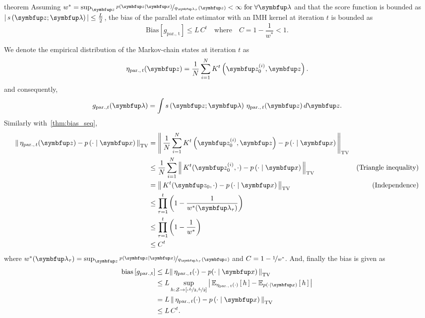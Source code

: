 
\begin{theoremEnd}{theorem}
  Assuming \(w^* = \sup_{\vz} \nicefrac{p\left(\vz\mid\vx\right)}{q_{\vlambda_{\tau}}\left(\vz\right)} < \infty \; \text{for}\;\forall \vlambda \) and that the score function is bounded as \(\left|\, s\left(\vz; \vlambda\right) \,\right| \leq \frac{L}{2}\), the bias of the parallel state estimator with an IMH kernel at iteration \(t\) is bounded as
  {\small
\[
    \mathrm{Bias}\left[ g_{\mathrm{par.,\, t}} \right] \leq L\,C^t \quad\text{where}\quad C = 1 - \frac{1}{w^*} < 1.
\]
  }
\end{theoremEnd}
\begin{proofEnd}
  We denote the empirical distribution of the Markov-chain states at iteration \(t\) as
  \begin{align}
    \eta_{\mathrm{par.},\, t}(\vz) = \frac{1}{N} \sum_{i=1}^N K^{t}\left(\vz_0^{(i)}, \vz\right).
  \end{align}
  and consequently,
  \begin{align}
      g_{\mathrm{par.}, t}(\vlambda) = \int s\left(\vz; \vlambda\right) \, \eta_{\mathrm{par.},\, t}(\vz) \, d\vz.
  \end{align}
  Similarly with~\cref{thm:bias_seq}, 
  \begin{align}
    \DTV{ \eta_{\mathrm{par.},\, t}(\vz) }{p\left(\cdot\mid\vx\right)}
    &= \DTV{\frac{1}{N} \sum_{i=1}^N K^{t}\left(\vz_0^{(i)}, \vz\right)}{p\left(\cdot\mid\vx\right)} \\
    &\leq \frac{1}{N} \sum_{i=1}^N  \DTV{K^t(\vz_0^{(i)}, \cdot)}{p\left(\cdot\mid\vx\right)} &\text{(Triangle inequality)} \\
    &=    \DTV{K^t(\vz_0, \cdot)}{p\left(\cdot\mid\vx\right)} &\text{(Independence)} \\
    &\leq \prod_{\tau=1}^t {\left(1 - \frac{1}{w^*(\vlambda_{\tau})}\right)} \\
    &\leq \prod_{\tau=1}^t {\left(1 - \frac{1}{w^*}\right)} \\
    &\leq C^t
  \end{align}
  where \(w^*(\vlambda_{\tau}) = \sup_{\vz} \nicefrac{p\left(\vz\mid\vx\right)}{q_{\vlambda_{\tau}}\left(\vz\right)} \) and \(C = 1 - \nicefrac{1}{w^*}\).
  And, finally the bias is given as
 \begin{align}
   \mathrm{bias}\left[ g_{\mathrm{par., t}} \right]
   &\leq L \DTV{\eta_{\mathrm{par.},\, t}(\cdot)}{p(\cdot\mid\vx)} \\
   &\leq L \sup_{h : \mathcal{Z} \rightarrow \left[ \text{-}\nicefrac{L}{2}, \nicefrac{L}{2} \right]} \left|\, \Esub{\eta_{\mathrm{par.},\, t}(\cdot)}{h} - \Esub{p(\cdot\mid\vx)}{h} \,\right| \\
   &= L\, \DTV{ \eta_{\mathrm{par.},\, t}(\cdot) }{p\left(\cdot\mid\vx\right)}  \\
   &\leq L \, C^t.
 \end{align}
\end{proofEnd}

